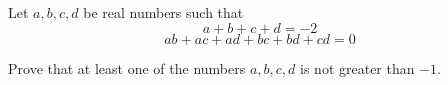 Let $a,b,c,d$ be real numbers such that\[a+b+c+d=-2\]\[ab+ac+ad+bc+bd+cd=0\]

Prove that at least one of the numbers $a,b,c,d$ is not greater than $-1$.